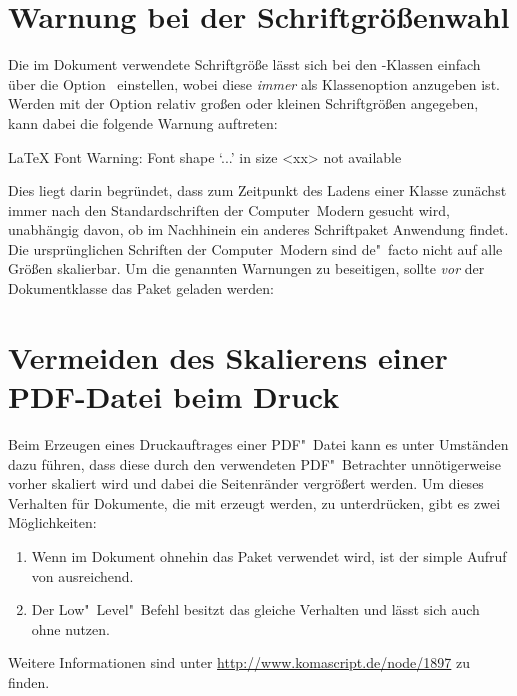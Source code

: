 \section{%
  Warnung bei der Schriftgrößenwahl%
  \label{sec:tips:fontsize}%
}
%
%
Die im Dokument verwendete Schriftgröße lässt sich bei den \KOMAScript-Klassen 
einfach über die Option~ einstellen, wobei diese \emph{immer} 
als Klassenoption anzugeben ist. Werden mit der Option relativ großen oder 
kleinen Schriftgrößen angegeben, kann dabei die folgende Warnung auftreten:
%
\begin{quoting}[rightmargin=0pt]
\begin{Code}[escapechar=§]
LaTeX Font Warning: Font shape `...' in size <xx> not available
\end{Code}
\end{quoting}
%
Dies liegt darin begründet, dass zum Zeitpunkt des Ladens einer Klasse zunächst 
immer nach den Standardschriften der Computer~Modern gesucht wird, unabhängig 
davon, ob im Nachhinein ein anderes Schriftpaket Anwendung findet. Die 
ursprünglichen Schriften der Computer~Modern sind de"~facto nicht auf alle 
Größen skalierbar. Um die genannten Warnungen zu beseitigen, sollte \emph{vor} 
der Dokumentklasse das Paket  geladen werden:
%
\begin{quoting}[rightmargin=0pt]
\end{quoting}



\section{Vermeiden des Skalierens einer PDF-Datei beim Druck}
%
%
Beim Erzeugen eines Druckauftrages einer PDF"~Datei kann es unter Umständen 
dazu führen, dass diese durch den verwendeten PDF"~Betrachter unnötigerweise 
vorher skaliert wird und dabei die Seitenränder vergrößert werden. Um dieses 
Verhalten für Dokumente, die mit  erzeugt werden, zu 
unterdrücken, gibt es zwei Möglichkeiten:
%
\begin{enumerate}
\item Wenn im Dokument ohnehin das Paket  verwendet wird, 
  ist der simple Aufruf von 
  ausreichend.
\item Der Low"~Level"~Befehl
  besitzt das gleiche Verhalten und lässt sich auch ohne  
  nutzen.
\end{enumerate}
%
Weitere Informationen sind unter \url{http://www.komascript.de/node/1897} 
zu finden.


